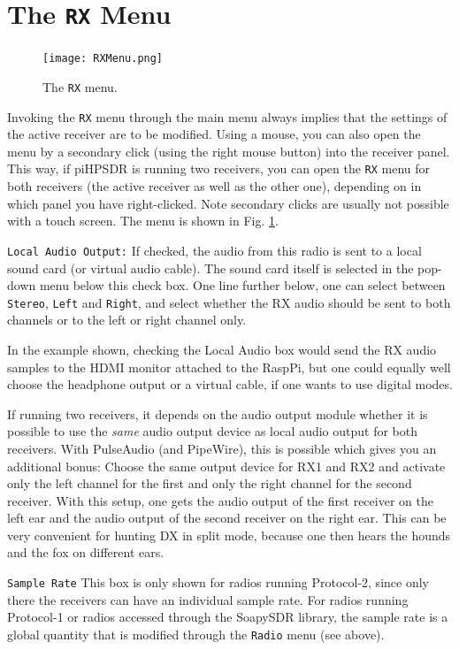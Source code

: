 \documentclass[12pt]{book}
\def\rett#1{\texttt{\color{red}#1}}
\def\bltt#1{\texttt{\color{blue}#1}}
\def\pH{pi\-HPSDR\xspace}
\begin{document}
\section{The \texttt{RX} Menu}

\begin{figure}[ht!]
\center
\texttt{[image: RXMenu.png]}
\caption{The \bltt{RX} menu.}
\label{fig:RXMenu}
\end{figure}

Invoking the \bltt{RX} menu through the main menu always implies that the settings
of the active receiver are to be modified. Using a mouse, you can also open the menu
by a secondary click (using the right mouse button) into the receiver panel. This way,
if \pH is running two receivers, you can open the \bltt{RX} menu for both receivers
(the active receiver as well as the other one), depending on in which panel you have
right-clicked. Note secondary clicks are usually not possible with a touch screen.
The menu is shown in Fig. \ref{fig:RXMenu}.

\rett{Local Audio Output:} If checked, the audio from this radio is sent to a local
sound card (or virtual audio cable). The sound card itself is selected in the
pop-down menu below this check box. One line further below, one can select between
\texttt{Stereo}, \texttt{Left} and \texttt{Right}, and select whether the RX
audio should be sent to both channels or to the left or right channel only.

In the example shown, checking the Local Audio box would send the RX audio
samples to the HDMI monitor attached to the RaspPi, but one could equally
well choose the headphone output or a virtual cable, if one wants to use
digital modes.

If running two receivers, it depends on the audio output module whether
it is possible to use the \textit{same} audio output device as local audio output
for both receivers. With PulseAudio (and PipeWire), this is possible which gives you an additional
bonus:
Choose the same output device for RX1 and RX2 and activate only
the left channel for the first and only the right channel for the second receiver.
With this setup,
one gets the audio output of the first receiver on the left ear and the audio output of
the second receiver on the right ear. This can be very convenient for hunting DX in split mode,
because one then hears the hounds and the fox on different ears.

\rett{Sample Rate} This box is only shown for radios running Protocol-2, since only there the
receivers can have an individual sample rate. For radios running Protocol-1 or radios accessed
through the SoapySDR library, the sample rate is a global quantity that is modified
through the \bltt{Radio} menu (see above).
\end{document}
